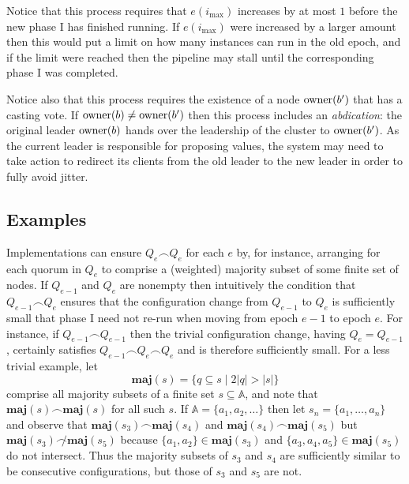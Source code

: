 \documentclass[journal]{IEEEtran}
\begin{document}
Notice that this process requires that $e(i_\mathrm{max})$ increases by at most
$1$ before the new phase I has finished running. If $e(i_\mathrm{max})$ were
increased by a larger amount then this would put a limit on how many instances
can run in the old epoch, and if the limit were reached then the pipeline may
stall until the corresponding phase I was completed.

Notice also that this process requires the existence of a node $\mathrm{owner}(b')$
that has a casting vote. If $\mathrm{owner}(b) \ne \mathrm{owner}(b')$ then this process
includes an \textit{abdication}: the original leader $\mathrm{owner}(b)$ hands over the
leadership of the cluster to $\mathrm{owner}(b')$. As the current leader is responsible
for proposing values, the system may need to take action to redirect its
clients from the old leader to the new leader in order to fully avoid jitter.

\subsection{Examples}\label{types-of-configuration-change}

\def\maj#1{\mathbf{maj}(#1)}

Implementations can ensure $Q_e \frown Q_e$ for each $e$ by, for instance,
arranging for each quorum in $Q_e$ to comprise a (weighted) majority subset of
some finite set of nodes.  If $Q_{e-1}$ and $Q_e$ are nonempty then intuitively
the condition that $Q_{e-1} \frown Q_e$ ensures that the configuration change
from $Q_{e-1}$ to $Q_e$ is sufficiently small that phase I need not re-run when
moving from epoch $e-1$ to epoch $e$.  For instance, if $Q_{e-1} \frown
Q_{e-1}$ then the trivial configuration change, having $Q_e = Q_{e-1}$,
certainly satisfies $Q_{e-1} \frown Q_e \frown Q_e$ and is therefore
sufficiently small.
%
For a less trivial example, let \[\maj{s} = \{ q \subseteq s \mid 2 |q| > |s|
\}\] comprise all majority subsets of a finite set $s \subseteq \mathbb A$, and
note that $\maj{s} \frown \maj{s}$ for all such $s$.  If $\mathbb A = \{ a_1,
a_2, \ldots \}$ then let $s_n = \{a_1, \ldots, a_n\}$ and observe that
${\maj{s_3} \frown \maj{s_4}}$ and ${\maj{s_4} \frown \maj{s_5}}$ but
${\maj{s_3} \not\frown \maj{s_5}}$ because $\{a_1, a_2\} \in \maj{s_3}$ and
$\{a_3, a_4, a_5\} \in \maj{s_5}$ do not intersect. Thus the majority subsets
of $s_3$ and $s_4$ are sufficiently similar to be consecutive configurations,
but those of $s_3$ and $s_5$ are not.
\end{document}
